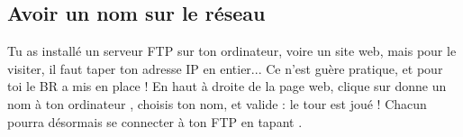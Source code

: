 \subsection{Avoir un nom sur le r\'eseau}
\label{dnsapp}

Tu as install\'e un serveur FTP sur ton ordinateur, voire un site web, mais pour le visiter, il faut taper ton adresse IP en entier...
Ce n'est gu\`ere pratique, et pour toi le BR a mis en place  !
En haut \`a droite de la page web, clique sur \og donne un nom \`a ton ordinateur \fg, choisis ton nom, et valide : le tour est jou\'e ! Chacun pourra d\'esormais se connecter \`a ton FTP en tapant .
